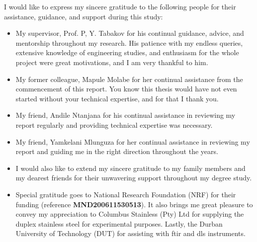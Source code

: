I would like to express my sincere gratitude to the following people for their assistance, guidance, and support during this study:

\begin{itemize}
    \item My supervisor, Prof. P, Y. Tabakov for his continual guidance, advice, and mentorship throughout my research. His patience with my endless queries, extensive knowledge of engineering studies, and enthusiasm for the whole project were great motivations, and I am very thankful to him.

    \item My former colleague, Mapule Molabe for her continual assistance from the commencement of this report. You know this thesis would have not even started without your technical expertise, and for that I thank you.  

    \item My friend, Andile Ntanjana for his continual assistance in reviewing my report regularly and providing technical expertise was necessary.

    \item My friend, Yamkelani Mlunguza for her continual assistance in reviewing my report and guiding me in the right direction throughout the years. 

    \item I would also like to extend my sincere gratitude to my family members and my dearest friends for their unwavering support throughout my degree study.
    
    \item Special gratitude goes to National Research Foundation (NRF) for their funding (reference \textbf{MND200611530513}). It also brings me great pleasure to convey my appreciation to Columbus Stainless (Pty) Ltd for supplying the duplex stainless steel for experimental purposes. Lastly, the Durban University of Technology (DUT) for assisting with \acrshort{ftir} and \acrshort{dls} instruments.
 \end{itemize}